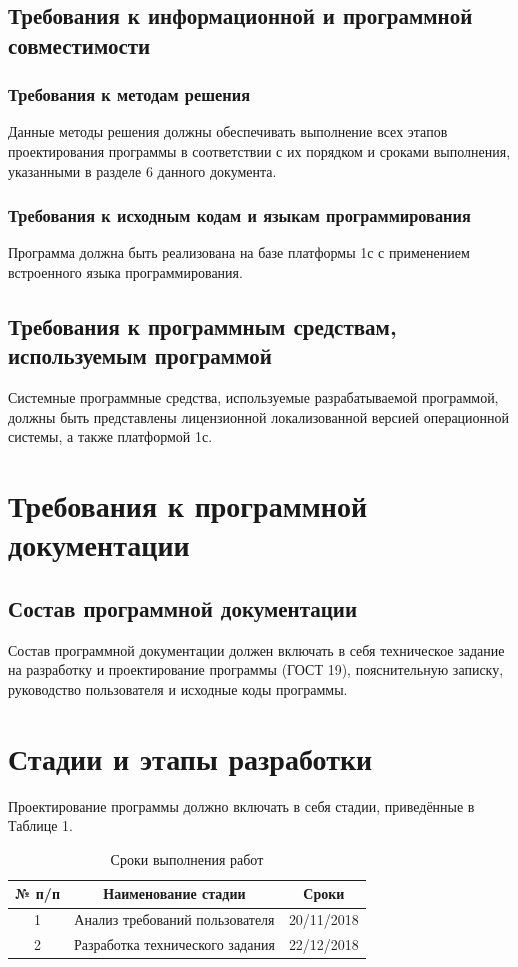 \documentclass[14pt, a4paper]{extarticle}
\begin{document}
	\subsection{Требования к информационной и программной совместимости}
	\subsubsection{Требования к методам решения}
	
	Данные методы решения должны обеспечивать выполнение всех этапов проектирования программы в соответствии с их порядком и сроками выполнения, указанными в разделе 6 данного документа.
	\subsubsection{Требования к исходным кодам и языкам программирования}
	Программа должна быть реализована на базе платформы 1с с применением встроенного языка программирования.
	
	\subsection{Требования к программным средствам, используемым программой}
	Системные программные средства, используемые разрабатываемой программой, должны быть представлены лицензионной локализованной версией операционной системы, а также платформой 1с.
	
	\section{Требования к программной документации}
	\subsection{Состав программной документации}
	Состав программной документации должен включать в себя техническое задание на разработку и проектирование программы (ГОСТ 19), пояснительную записку, руководство пользователя и исходные коды программы.
	
	\section{Стадии и этапы разработки}
	Проектирование программы должно включать в себя стадии, приведённые в Таблице 1.\\
	\begin{table}[h!]
		\caption{Сроки выполнения работ}
		\begin{center}
			
			\label{tab:table1}
			\begin{tabular}{|c|c|c|}
				\hline
				№ п/п & Наименование стадии             & Сроки         \\
				\hline
				1     & Анализ требований пользователя  & 20/11/2018     \\
				\hline
				2     & Разработка технического задания & 22/12/2018     \\
				\hline
			\end{tabular}
		\end{center}
	\end{table}
	
\end{document}
